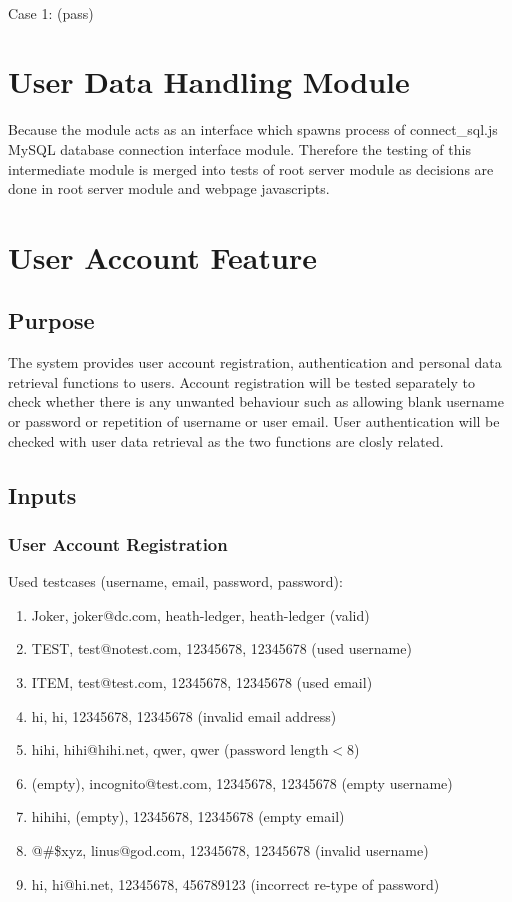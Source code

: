 ~

Case 1: (pass)


\section{User Data Handling Module}
Because the module acts as an interface which spawns process of connect\_sql.js MySQL database connection interface module. Therefore the testing of this intermediate module is merged into tests of root server module as decisions are done in root server module and webpage javascripts.

\section{User Account Feature}
\subsection{Purpose}
The system provides user account registration, authentication and personal data retrieval functions to users. Account registration will be tested separately to check whether there is any unwanted behaviour such as allowing blank username or password or repetition of username or user email. User authentication will be checked with user data retrieval as the two functions are closly related.

\subsection{Inputs}
\subsubsection{User Account Registration}
Used testcases (username, email, password, password):
\begin{enumerate}
  \item Joker, joker@dc.com, heath-ledger, heath-ledger (valid)
  \item TEST, test@notest.com, 12345678, 12345678 (used username)
  \item ITEM, test@test.com, 12345678, 12345678 (used email)
  \item hi, hi, 12345678, 12345678 (invalid email address)
  \item hihi, hihi@hihi.net, qwer, qwer (\(\text{password length}<8\))
  \item (empty), incognito@test.com, 12345678, 12345678 (empty username)
  \item hihihi, (empty), 12345678, 12345678 (empty email)
  \item @\#\$xyz, linus@god.com, 12345678, 12345678 (invalid username)
  \item hi, hi@hi.net, 12345678, 456789123 (incorrect re-type of password)
\end{enumerate}

